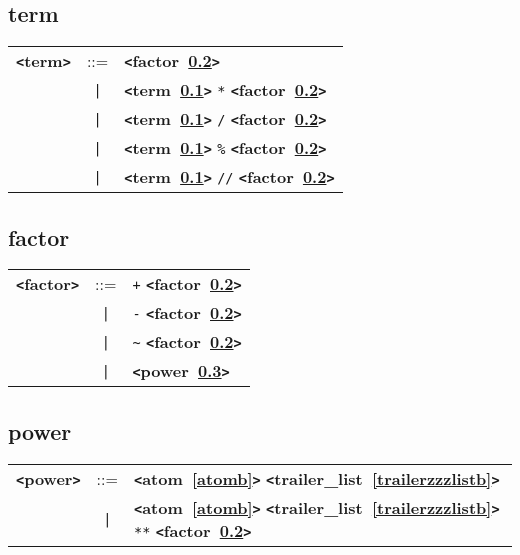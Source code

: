 \documentclass[12pt]{article}
\begin{document}
\subsection{term}
\label{termb}
\begin{tabular}{lcl}
{\bf \verb+<+term\verb+>+} & ::=  & {\bf \verb+<+factor~\ref{factorb}\verb+>+}  \\
 & \verb+|+  & {\bf \verb+<+term~\ref{termb}\verb+>+}  \verb|*| {\bf \verb+<+factor~\ref{factorb}\verb+>+}  \\
 & \verb+|+  & {\bf \verb+<+term~\ref{termb}\verb+>+}  \verb|/| {\bf \verb+<+factor~\ref{factorb}\verb+>+}  \\
 & \verb+|+  & {\bf \verb+<+term~\ref{termb}\verb+>+}  \verb|%| {\bf \verb+<+factor~\ref{factorb}\verb+>+}  \\
 & \verb+|+  & {\bf \verb+<+term~\ref{termb}\verb+>+}  \verb|//| {\bf \verb+<+factor~\ref{factorb}\verb+>+}  \\
\end{tabular}

\subsection{factor}
\label{factorb}
\begin{tabular}{lcl}
{\bf \verb+<+factor\verb+>+} & ::=  & \verb|+| {\bf \verb+<+factor~\ref{factorb}\verb+>+}  \\
 & \verb+|+  & \verb|-| {\bf \verb+<+factor~\ref{factorb}\verb+>+}  \\
 & \verb+|+  & \verb|~| {\bf \verb+<+factor~\ref{factorb}\verb+>+}  \\
 & \verb+|+  & {\bf \verb+<+power~\ref{powerb}\verb+>+}  \\
\end{tabular}

\subsection{power}
\label{powerb}
\begin{tabular}{lcl}
{\bf \verb+<+power\verb+>+} & ::=  & {\bf \verb+<+atom~\ref{atomb}\verb+>+}  {\bf \verb+<+trailer\_list~\ref{trailerzzzlistb}\verb+>+}  \\
 & \verb+|+  & {\bf \verb+<+atom~\ref{atomb}\verb+>+}  {\bf \verb+<+trailer\_list~\ref{trailerzzzlistb}\verb+>+}  \verb|**| {\bf \verb+<+factor~\ref{factorb}\verb+>+}  \\
\end{tabular} \\
\end{document}
